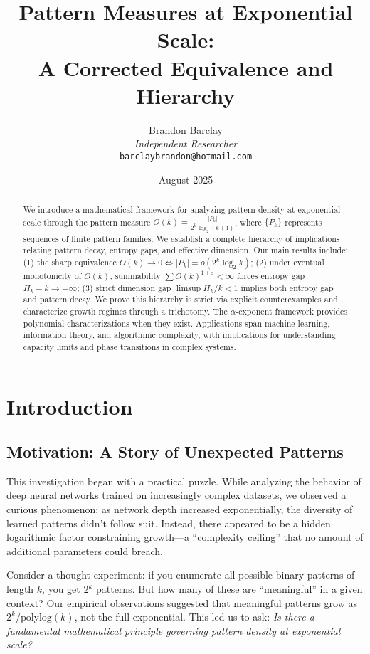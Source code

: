 \documentclass[11pt]{article}
\title{Pattern Measures at Exponential Scale:\\
A Corrected Equivalence and Hierarchy}
\author{Brandon Barclay\\
\textit{Independent Researcher}\\
\texttt{barclaybrandon@hotmail.com}}
\date{August 2025}
\theoremstyle{definition}
\newcommand{\eps}{\varepsilon}
\begin{document}
\maketitle

\begin{abstract}
We introduce a mathematical framework for analyzing pattern density at exponential scale through the pattern measure $O(k)=\frac{|P_k|}{2^k\,\log_2(k+1)}$, where $\{P_k\}$ represents sequences of finite pattern families. We establish a complete hierarchy of implications relating pattern decay, entropy gaps, and effective dimension. Our main results include: (1) the sharp equivalence $O(k)\to 0 \iff |P_k|=o(2^k\log_2 k)$; (2) under eventual monotonicity of $O(k)$, summability $\sum O(k)^{1+\eps} < \infty$ forces entropy gap $H_k-k\to-\infty$; (3) strict dimension gap $\limsup H_k/k<1$ implies both entropy gap and pattern decay. We prove this hierarchy is strict via explicit counterexamples and characterize growth regimes through a trichotomy. The $\alpha$-exponent framework provides polynomial characterizations when they exist. Applications span machine learning, information theory, and algorithmic complexity, with implications for understanding capacity limits and phase transitions in complex systems.
\end{abstract}

\section{Introduction}

\subsection{Motivation: A Story of Unexpected Patterns}

This investigation began with a practical puzzle. While analyzing the behavior of deep neural networks trained on increasingly complex datasets, we observed a curious phenomenon: as network depth increased exponentially, the diversity of learned patterns didn't follow suit. Instead, there appeared to be a hidden logarithmic factor constraining growth—a ``complexity ceiling'' that no amount of additional parameters could breach.

Consider a thought experiment: if you enumerate all possible binary patterns of length $k$, you get $2^k$ patterns. But how many of these are ``meaningful'' in a given context? Our empirical observations suggested that meaningful patterns grow as $2^k/\text{polylog}(k)$, not the full exponential. This led us to ask: \textit{Is there a fundamental mathematical principle governing pattern density at exponential scale?}
\end{document}
